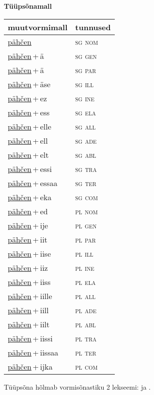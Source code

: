 
\vspace{1.8em}
\begin{minipage}{\textwidth}
\textbf{Tüüpsõnamall \,}\\

\begin{sideways}
\begin{tabular}{l l}
muutvormimall & tunnused \\
\hline
\underline{pähčen} & \textsc{ sg nom } \\
\underline{pähčen}\,+\,ä & \textsc{ sg gen } \\
\underline{pähčen}\,+\,ä & \textsc{ sg par } \\
\underline{pähčen}\,+\,äse & \textsc{ sg ill } \\
\underline{pähčen}\,+\,ez & \textsc{ sg ine } \\
\underline{pähčen}\,+\,ess & \textsc{ sg ela } \\
\underline{pähčen}\,+\,elle & \textsc{ sg all } \\
\underline{pähčen}\,+\,ell & \textsc{ sg ade } \\
\underline{pähčen}\,+\,elt & \textsc{ sg abl } \\
\underline{pähčen}\,+\,essi & \textsc{ sg tra } \\
\underline{pähčen}\,+\,essaa & \textsc{ sg ter } \\
\underline{pähčen}\,+\,eka & \textsc{ sg com } \\
\underline{pähčen}\,+\,ed & \textsc{ pl nom } \\
\underline{pähčen}\,+\,ije & \textsc{ pl gen } \\
\underline{pähčen}\,+\,iit & \textsc{ pl par } \\
\underline{pähčen}\,+\,iise & \textsc{ pl ill } \\
\underline{pähčen}\,+\,iiz & \textsc{ pl ine } \\
\underline{pähčen}\,+\,iiss & \textsc{ pl ela } \\
\underline{pähčen}\,+\,iille & \textsc{ pl all } \\
\underline{pähčen}\,+\,iill & \textsc{ pl ade } \\
\underline{pähčen}\,+\,iilt & \textsc{ pl abl } \\
\underline{pähčen}\,+\,iissi & \textsc{ pl tra } \\
\underline{pähčen}\,+\,iissaa & \textsc{ pl ter } \\
\underline{pähčen}\,+\,ijka & \textsc{ pl com } \\
\end{tabular}
\end{sideways}
\label{tab:tüüpsõnamall-pähčen}

\end{minipage}

 
\vspace{1em}
\noindent Tüüpsõna hõlmab vormisõnastiku 2 lekseemi:  ja .
